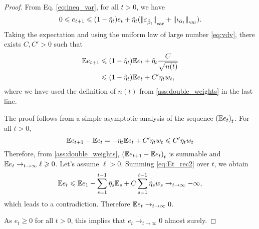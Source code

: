 \begin{proof}
From Eq. \eqref{eq:ineq_var}, for all $t > 0$, we have
\begin{equation}\label{eq:Et_rec}
    0 \leqslant e_{t+1} \leqslant 
    (1 - \tilde \eta_t) e_t
    + \tilde \eta_t
    ({\Vert \varepsilon_{\hat \beta_t} \Vert}_{\text{\upshape var}} + 
    {\Vert \iota_{\hat \alpha_t} \Vert}_{\text{\upshape var}}).
\end{equation}
Taking the expectation and using the uniform law of 
large number \eqref{eq:vdv}, there exists $C, C' > 0$ such that
\begin{align}
    \mathbb{E} e_{t+1} &\leqslant (1 - \tilde \eta_t) \mathbb{E} e_t + \tilde \eta_t \frac{C}{\sqrt{n(t)}} \\
    &\leqslant (1 - \tilde \eta_t) \mathbb{E} e_t + C' \eta_t w_t,
\end{align}
where we have used the definition of $n(t)$ from \autoref{ass:double_weights} in the last line.

The proof follows from a simple asymptotic analysis of the sequence ${(\mathbb{E} e_t)}_t$.
For all $t > 0$, 
\begin{equation}\label{eq:Et_rec2}
    \mathbb{E} e_{t+1} - \mathbb{E} e_t = - \eta_t \mathbb{E} e_t + C' \eta_t w_t \leqslant C' \eta_t w_t
\end{equation}
Therefore, from \autoref{ass:double_weights}, ${(\mathbb{E} e_{t+1} - \mathbb{E} e_t)}_t$ is
summable and $\mathbb{E} e_t \to_{t \to \infty} \ell \geqslant 0$. Let's assume $\ell > 0$.
Summing \eqref{eq:Et_rec2} over $t$, we obtain
\begin{equation}
    \mathbb{E} e_t \leqslant \mathbb{E} e_1 - \sum_{s=1}^{t-1} \tilde \eta_s \mathbb{E}_s 
    + C\sum_{s=1}^{t-1} \tilde \eta_s w_s \to_{t \to \infty} - \infty,
\end{equation}
which leads to a contradiction. Therefore $\mathbb{E} e_t \to_{t \to \infty} 0$. 

As
$e_t \geq 0$ for all $t > 0$, this implies that $e_t \to_{t \to \infty} 0$
almost surely.
\end{proof}


